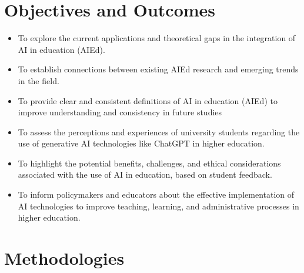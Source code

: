 \documentclass[conference]{IEEEtran}
\begin{document}
\section{Objectives and Outcomes}
\begin{itemize}
    \item  To explore the current applications and theoretical gaps in the integration of AI in education (AIEd).
\end{itemize}

\begin{itemize}
    \item  To establish connections between existing AIEd research and emerging trends in the field.
\end{itemize}

\begin{itemize}
    \item  To provide clear and consistent definitions of AI in education (AIEd) to improve understanding and consistency in future studies
\end{itemize}

\begin{itemize}
    \item  To assess the perceptions and experiences of university students regarding the use of generative AI technologies like ChatGPT in higher education.
\end{itemize}


\begin{itemize}
    \item To highlight the potential benefits, challenges, and ethical considerations associated with the use of AI in education, based on student feedback.
\end{itemize}


\begin{itemize}
    \item  To inform policymakers and educators about the effective implementation of AI technologies to improve teaching, learning, and administrative processes in higher education.
\end{itemize}


\section{Methodologies}
\end{document}
